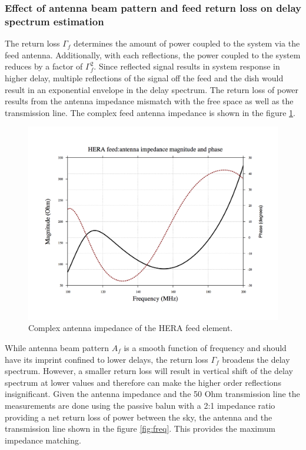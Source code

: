 \documentclass[twocolumn]{emulateapj}
\begin{document}
\subsubsection{Effect of antenna beam pattern and feed return loss on delay spectrum estimation}
The return loss $\Gamma_{f}$ determines the amount of power coupled to the system via the feed antenna. Additionally, with each reflections, the power coupled to the system reduces by a factor of $\Gamma_{f}^{2}$. Since reflected signal results in system response in higher delay, multiple reflections of the signal off the feed and the dish would result in an exponential envelope in the delay spectrum.  The return loss of power results from the antenna impedance mismatch with the free space as well as the transmission line. The complex feed antenna impedance is shown in the figure \ref{fig:feed_impedance}.
\begin{figure}
\centering
\includegraphics[width=\linewidth]{plots/Feed_impedance.png}
\caption{Complex antenna impedance of the HERA feed element.}
\label{fig:feed_impedance}
\end{figure} 
While antenna beam pattern $A_{f}$ is a smooth function of frequency and should have its imprint confined to lower delays, the return loss $\Gamma_{f}$ broadens the delay spectrum. However, a smaller return loss will result in vertical shift of the delay spectrum at lower values and therefore can make the higher order reflections insignificant. Given the antenna impedance and the 50 Ohm transmission line the measurements are done using the passive balun with a 2:1 impedance ratio providing a net return loss of power between the sky, the antenna and the transmission line shown in the figure \ref{fig:freq}. This provides the maximum impedance matching. \\
\end{document}
